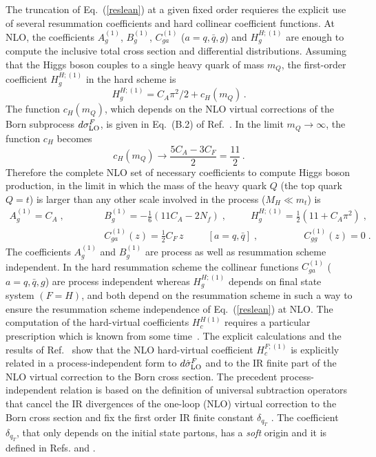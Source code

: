 \documentclass[12pt]{article}
\def\beeq{\begin{eqnarray}}
\def\eeeq{\end{eqnarray}}
\def\nn{\nonumber}
\newcommand\f[2]{\frac{#1}{#2}}
\def\to{\rightarrow}
\begin{document}
The truncation of Eq.~(\ref{reslean}) at a given fixed order requieres the explicit use of several resummation coefficients and hard collinear coefficient functions.
At NLO, the coefficients $A^{(1)}_{g}$, $B^{(1)}_{g}$, $C^{(1)}_{ga}$ ($a=q,{\bar q},g$) and $H^{H;(1)}_{g}$ are enough to compute the inclusive total cross section and differential distributions. Assuming that the Higgs boson couples to a single heavy quark of mass $m_Q$, the first-order coefficient $H_g^{H;(1)}$ in the hard scheme is~\cite{Catani:2013tia}
\begin{equation}
\label{H1g}
H_g^{H;(1)}=C_A\pi^2/2+c_H(m_Q)\, .
\end{equation}
The function $c_H(m_Q)$, which depends on the NLO virtual corrections of the Born subprocess $d\sigma^{F}_{\rm LO}$, is given in Eq.~(B.2) of Ref.~\cite{Spira:1995rr}. In the limit $m_Q\to \infty$, the function $c_H$ becomes
\begin{equation}
c_H(m_Q)\longrightarrow\f{5C_A-3C_F}{2}=\f{11}{2}\, .
\end{equation}
Therefore the complete NLO set of necessary coefficients to compute Higgs boson production, in the limit in which the mass of the heavy quark $Q$ (the top quark $Q=t$) is larger than any other scale involved in the process ($M_{H}\ll m_{t}$) is
\beeq
A^{(1)}_{g}=C_{A}\;,\;\;\;\;\;\;\;\;\;&&B^{(1)}_{g}=- \f{1}{6} \left( 11 C_A - 2 N_f \right)\;,\;\;\;\;\;\;\;\;\;H^{H;(1)}_{g}=\f{1}{2}(11+C_{A}\pi^{2})\;,\nn\\
&&\!\!\!\!\!\!\!\!\!\!\!\!\!\!\!\!\!\!\!\!\!\!\!\!\!\!\!\!\!\!\!\!\!C^{(1)}_{ga}(z)=\f{1}{2}C_F\, z\;\;\;\;\;\;\;\;\;\left[a=q,{\bar q}\right]\;,\;\;\;\;\;\;\;\;\;\;\;\;\;\;\;\;\;C^{(1)}_{gg}(z)=0\;.
\eeeq
The coefficients $A^{(1)}_{g}$ and $B^{(1)}_{g}$ are process as well as resummation scheme independent. In the hard resummation scheme the collinear functions $C^{(1)}_{ga}$ ($a=q,{\bar q},g$) are process independent whereas $H^{H;(1)}_{g}$ depends on final state system $(F=H)$, and both depend on the resummation scheme in such a way to ensure the resummation scheme independence of Eq.~(\ref{reslean}) at NLO. The computation of the hard-virtual coefficients $H^{H(1)}_{c}$ requires a particular prescription which is known from some time~\cite{deFlorian:2001zd}. The explicit calculations and the results of Ref.~\cite{deFlorian:2001zd} show that the NLO hard-virtual coefficient $H^{F;(1)}_{c}$ is explicitly related in a process-independent form to $d{\hat \sigma}^{F}_{\rm LO}$ and to the IR finite part of the NLO virtual correction to the Born cross section. The precedent process-independent relation is based on the definition of universal subtraction operators that cancel the IR divergences of the one-loop (NLO) virtual correction to the Born cross section and fix the first order IR finite constant $\delta_{q_{T}}$ \cite{Catani:2013tia}. The coefficient $\delta_{q_{T}}$, that only depends on the initial state partons, has a \textit{soft} origin and it is defined in Refs. \cite{deFlorian:2001zd} and \cite{Catani:2013tia}.
\end{document}
